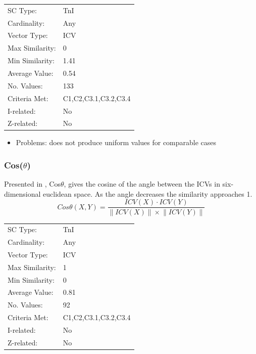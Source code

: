 \documentclass{article}
\begin{document}
\begin{center}
\begin{tabular}{ll}
 SC Type:         &  TnI                   \\
 Cardinality:     &  Any                   \\
 Vector Type:     &  ICV                   \\
 Max Similarity:  &  0                     \\
 Min Similarity:  &  1.41                  \\
 Average Value:   &  0.54                  \\
 No. Values:      &  133                   \\
 Criteria Met:    &  C1,C2,C3.1,C3.2,C3.4  \\
 I-related:       &  No                    \\
 Z-related:       &  No                    \\
\end{tabular}
\end{center}


\begin{itemize}
\item Problems: does not produce uniform values for comparable cases
\end{itemize}
\subsubsection{Cos($\theta$)}
\label{sec-15-4-3}

Presented in \citet{Rogers1992}, Cos$\theta$, gives the cosine of the
angle between the ICVs in six-dimensional euclidean space. As the
angle decreases the similarity approaches 1.
$$Cos\theta(X,Y)=\frac{ICV(X)\cdot ICV(Y)}{\left\|ICV(X)\right\|\times\left\|ICV(Y)\right\|}$$

\begin{center}
\begin{tabular}{ll}
 SC Type:         &  TnI                   \\
 Cardinality:     &  Any                   \\
 Vector Type:     &  ICV                   \\
 Max Similarity:  &  1                     \\
 Min Similarity:  &  0                     \\
 Average Value:   &  0.81                  \\
 No. Values:      &  92                    \\
 Criteria Met:    &  C1,C2,C3.1,C3.2,C3.4  \\
 I-related:       &  No                    \\
 Z-related:       &  No                    \\
\end{tabular}
\end{center}
\end{document}
